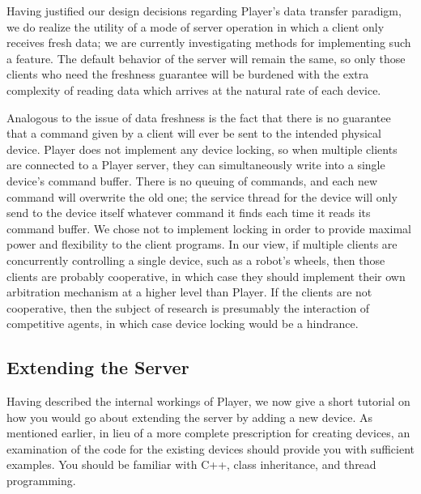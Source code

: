 \documentclass[11pt]{article}
\begin{document}
Having justified our design decisions regarding Player's data transfer
paradigm, we do realize the utility
of a mode of server operation in which a client only receives fresh
data;  we are currently investigating methods for implementing such
a feature.  The default behavior of the server will remain the same, so
only those clients who need the freshness guarantee will be burdened
with the extra complexity of reading data which arrives at the 
natural rate of each device.

Analogous to the issue of data freshness is the fact that there
is no guarantee that a command given by a client will ever be sent to
the intended physical device.  Player does not implement any device
locking, so when multiple clients are connected to 
a Player server, they can simultaneously write into 
a single device's command buffer.  There is no queuing of commands, and
each new command will overwrite the old one; 
the service thread for the device will only send to the device itself 
whatever command it finds each time it reads its command buffer.  We
chose not to implement locking in order to provide maximal power and
flexibility to the client programs.  In our view, if multiple
clients are concurrently controlling a single device, such as a robot's
wheels, then those clients are probably cooperative, in which case they
should implement their own arbitration mechanism at a higher level than
Player.  If the clients are not cooperative, then the subject of research
is presumably the interaction of competitive agents, in which case device
locking would be a hindrance.

\subsection{Extending the Server}
Having described the internal workings of Player, we now give a short
tutorial on how you would go about extending the server by adding
a new device.  As mentioned earlier, in lieu of a more complete prescription
for creating devices, an examination of the code for
the existing devices should provide you with
sufficient examples.  You should be familiar with C++, class 
inheritance, and thread programming.
\end{document}
